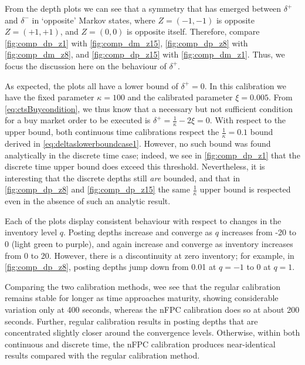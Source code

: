 From the depth plots we can see that a symmetry that has emerged between $\delta^+$ and $\delta^-$ in `opposite' Markov states, where $Z=(-1,-1)$ is opposite $Z=(+1,+1)$, and  $Z=(0,0)$ is opposite itself. Therefore, compare \autoref{fig:comp_dp_z1} with \autoref{fig:comp_dm_z15}, \autoref{fig:comp_dp_z8} with \autoref{fig:comp_dm_z8}, and \autoref{fig:comp_dp_z15} with \autoref{fig:comp_dm_z1}. Thus, we focus the discussion here on the behaviour of $\delta^+$.

As expected, the plots all have a lower bound of $\delta^+=0$. In this calibration we have the fixed parameter $\kappa=100$ and the calibrated parameter $\xi = 0.005$. From \eqref{eq:ctsBuycondition}, we thus know that a necessary but not sufficient condition for a buy market order to be executed is ${\delta^+} =  \frac{1}{\kappa} - 2 \xi = 0$. With respect to the upper bound, both continuous time calibrations respect the $\frac{1}{\kappa}=0.1$ bound derived in \eqref{eq:deltaslowerboundcase1}. However, no such bound was found analytically in the discrete time case; indeed, we see in \autoref{fig:comp_dp_z1} that the discrete time upper bound does exceed this threshold. Nevertheless, it is interesting that the discrete depths still \emph{are} bounded, and that in \autoref{fig:comp_dp_z8} and \autoref{fig:comp_dp_z15} the same $\frac{1}{\kappa}$ upper bound is respected even in the absence of such an analytic result.

Each of the plots display consistent behaviour with respect to changes in the inventory level $q$. Posting depths increase and converge as $q$ increases from -20 to 0 (light green to purple), and again increase and converge as inventory increases from 0 to 20. However, there is a discontinuity at zero inventory; for example, in \autoref{fig:comp_dp_z8}, posting depths jump down from 0.01 at $q=-1$ to 0 at $q=1$.

Comparing the two calibration methods, wee see that the regular calibration remains stable for longer as time approaches maturity, showing considerable variation only at 400 seconds, whereas the nFPC calibration does so at about 200 seconds. Further, regular calibration results in posting depths that are concentrated slightly closer around the convergence levels. Otherwise, within both continuous and discrete time, the nFPC calibration produces near-identical results compared with the regular calibration method. 


